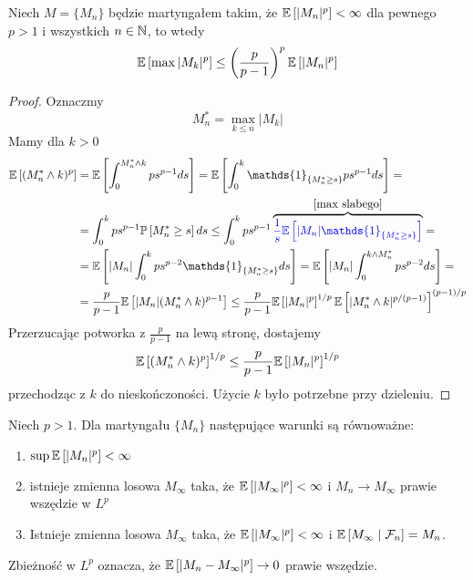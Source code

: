 \begin{theorem}
  Niech $M=\{M_n\}$ będzie martyngałem takim, że $\expected{|M_n|^p}<\infty$ dla pewnego $p>1$ i wszystkich $n\in\operatorname{\mathbb{N}}$, to wtedy
  $$\expected{\max|M_k|^p}\leq\left(\frac{p}{p-1}\right)^p\expected{|M_n|^p}$$
\end{theorem}

\begin{proof}
  Oznaczmy
  $$M_n^*=\max_{k\leq n}|M_k|$$
  Mamy dla $k>0$
  \begin{align*}
    \expected{(M_n^*\land k)^p}&=\expected{\int_0^{M_n^*\land k}ps^{p-1}ds}=\expected{\int_0^k\mathds{1}_{\{M_n^*\geq s\}}ps^{p-1}ds}=\\ 
                               &=\int_0^kps^{p-1}\prob{M_n^*\geq s}ds\leq\int_0^kps^{p-1}\overbrace{\color{blue}\frac{1}{s}\expected{|M_n|\mathds{1}_{\{M_n^*\geq s\}}}}^{\ref{max slabego}}=\\ 
                               &=\expected{|M_n|\int_0^kps^{p-2}\mathds{1}_{\{M_n^*\geq s\}}ds}=\expected{|M_n|\int_0^{k\land M_n^*}ps^{p-2}ds}=\\ 
                               &=\frac{p}{p-1}\expected{|M_n|(M_n^*\land k)^{p-1}}\leq\frac{p}{p-1}\expected{|M_n|^p}^{1/p}\expected{|M_n^*\land k|^{p/(p-1)}}^{(p-1)/p}
  \end{align*}
  Przerzucając potworka z $\frac{p}{p-1}$ na lewą stronę, dostajemy
  $$\expected{(M_n^*\land k)^p}^{1/p}\leq \frac{p}{p-1}\expected{|M_n|^p}^{1/p}$$
  przechodząc z $k$ do nieskończoności. Użycie $k$ było potrzebne przy dzieleniu.
\end{proof}

\begin{theorem}\label{tw 7.5}
  Niech $p>1$. Dla martyngału $\{M_n\}$ następujące warunki są równoważne:
  \begin{enumerate}
    \item $\sup \expected{|M_n|^p}<\infty$
    \item istnieje zmienna losowa $M_\infty$ taka, że $\expected{|M_\infty|^p}<\infty$ i $M_n\to M_\infty$ prawie wszędzie w $L^p$
    \item Istnieje zmienna losowa $M_\infty$ taka, że $\expected{|M_\infty|^p}<\infty$ i $\expected{M_\infty}{\set{F}_n}=M_n$.
  \end{enumerate}
\end{theorem}

\begin{dygresja}
  Zbieżność w $L^p$ oznacza, że $\expected{|M_n-M_\infty|^p}\to 0$ prawie wszędzie.
\end{dygresja}

